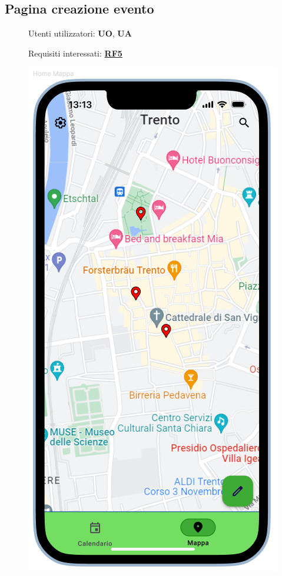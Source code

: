 \documentclass{article}
\begin{document}
\subsection{Pagina creazione evento}
\begin{description}
    \item[] Utenti utilizzatori: \textbf{UO}, \textbf{UA}
    \item[] Requisiti interessati: \hyperref[rf_5]{\textbf{RF5}}
    \item[] \begin{center}
            \includegraphics[scale=0.6]{Home_Mappa.png}
        \end{center}
\end{description}
\clearpage
\end{document}
